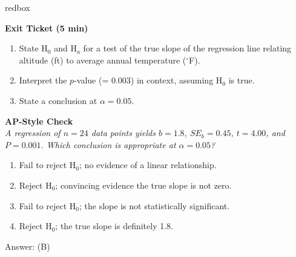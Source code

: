 \documentclass[10pt]{article}
\begin{document}
\begin{skillbox}{redbox}
\begin{minipage}[t]{0.48\linewidth}
    \textbf{Exit Ticket (5 min)}
    \begin{enumerate}
        \item State H$_0$ and H$_a$ for a test of the true slope of the regression
              line relating altitude (ft) to average annual temperature ($^\circ$F).
        \item Interpret the $p$-value (= 0.003) in context, assuming H$_0$ is true.
        \item State a conclusion at $\alpha = 0.05$.
    \end{enumerate}
\end{minipage}
\hfill
\begin{minipage}[t]{0.48\linewidth}
    \textbf{AP-Style Check}\\
    \textit{A regression of $n = 24$ data points yields $b = 1.8$, $SE_b = 0.45$,
    $t = 4.00$, and $P = 0.001$. Which conclusion is appropriate at $\alpha = 0.05$?}
    \begin{enumerate}[label=(\Alph*)]
        \item Fail to reject H$_0$; no evidence of a linear relationship.
        \item Reject H$_0$; convincing evidence the true slope is not zero.
        \item Fail to reject H$_0$; the slope is not statistically significant.
        \item Reject H$_0$; the true slope is definitely 1.8.
    \end{enumerate}
    Answer: (B)
\end{minipage}
\end{skillbox}
\end{document}
